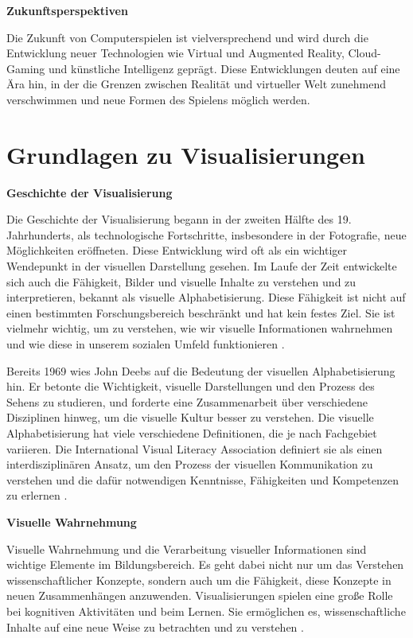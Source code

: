 \textbf{Zukunftsperspektiven}

Die Zukunft von Computerspielen ist vielversprechend und wird durch die Entwicklung neuer Technologien wie Virtual und Augmented Reality, Cloud-Gaming und künstliche Intelligenz geprägt. Diese Entwicklungen deuten auf eine Ära hin, in der die Grenzen zwischen Realität und virtueller Welt zunehmend verschwimmen und neue Formen des Spielens möglich werden.


\section{Grundlagen zu Visualisierungen}

\textbf{Geschichte der Visualisierung}

Die Geschichte der Visualisierung begann in der zweiten Hälfte des 19. Jahrhunderts, als technologische Fortschritte, insbesondere in der Fotografie, neue Möglichkeiten eröffneten. Diese Entwicklung wird oft als ein wichtiger Wendepunkt in der visuellen Darstellung gesehen. Im Laufe der Zeit entwickelte sich auch die Fähigkeit, Bilder und visuelle Inhalte zu verstehen und zu interpretieren, bekannt als visuelle Alphabetisierung. Diese Fähigkeit ist nicht auf einen bestimmten Forschungsbereich beschränkt und hat kein festes Ziel. Sie ist vielmehr wichtig, um zu verstehen, wie wir visuelle Informationen wahrnehmen und wie diese in unserem sozialen Umfeld funktionieren \cite{Simunek2009}.

Bereits 1969 wies John Deebs auf die Bedeutung der visuellen Alphabetisierung hin. Er betonte die Wichtigkeit, visuelle Darstellungen und den Prozess des Sehens zu studieren, und forderte eine Zusammenarbeit über verschiedene Disziplinen hinweg, um die visuelle Kultur besser zu verstehen. Die visuelle Alphabetisierung hat viele verschiedene Definitionen, die je nach Fachgebiet variieren. Die International Visual Literacy Association definiert sie als einen interdisziplinären Ansatz, um den Prozess der visuellen Kommunikation zu verstehen und die dafür notwendigen Kenntnisse, Fähigkeiten und Kompetenzen zu erlernen \cite{Wiebe2001}.

\textbf{Visuelle Wahrnehmung}

Visuelle Wahrnehmung und die Verarbeitung visueller Informationen sind wichtige Elemente im Bildungsbereich. Es geht dabei nicht nur um das Verstehen wissenschaftlicher Konzepte, sondern auch um die Fähigkeit, diese Konzepte in neuen Zusammenhängen anzuwenden. Visualisierungen spielen eine große Rolle bei kognitiven Aktivitäten und beim Lernen. Sie ermöglichen es, wissenschaftliche Inhalte auf eine neue Weise zu betrachten und zu verstehen \cite{Wiebe2001}.

